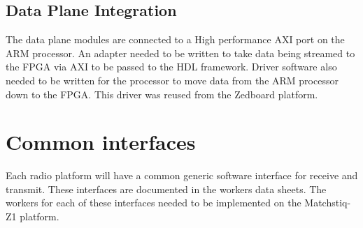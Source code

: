   \subsection{Data Plane Integration}
    The data plane modules are connected to a High performance AXI port on the ARM processor.  An adapter needed to be written to take data being streamed to the FPGA via AXI to be passed to the HDL framework.  Driver software also needed to be written for the processor to move data from the ARM processor down to the FPGA.  This driver was reused from the Zedboard platform.

\section{Common interfaces}
  Each radio platform will have a common generic software interface for receive and transmit.  These interfaces are documented in the workers data sheets.  The workers for each of these interfaces needed to be implemented on the Matchstiq-Z1 platform.


